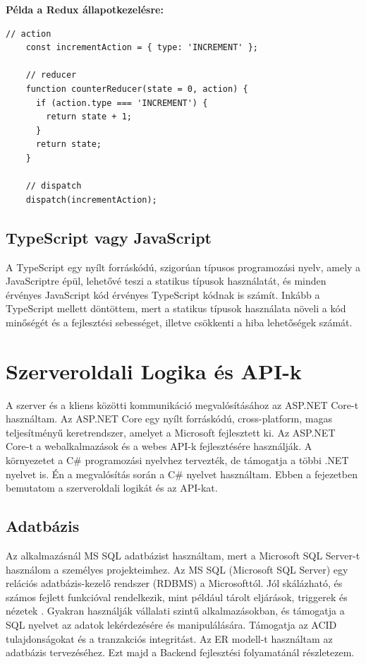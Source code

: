 \textbf{Példa a Redux állapotkezelésre:}
\begin{lstlisting}[style=es6, morekeywords={document, P5, katex}]
    // action
    const incrementAction = { type: 'INCREMENT' };
    
    // reducer
    function counterReducer(state = 0, action) {
      if (action.type === 'INCREMENT') {
        return state + 1;
      }
      return state;
    }
    
    // dispatch
    dispatch(incrementAction);
\end{lstlisting}

\subsection*{TypeScript vagy JavaScript}
A TypeScript egy nyílt forráskódú, szigorúan típusos programozási nyelv,
amely a JavaScriptre épül, lehetővé teszi a statikus típusok használatát,
és minden érvényes JavaScript kód érvényes TypeScript kódnak is számít.
Inkább a TypeScript mellett döntöttem, mert a statikus típusok használata
növeli a kód minőségét és a fejlesztési sebességet, illetve csökkenti a hiba lehetőségek számát.

\section{Szerveroldali Logika és API-k}
A szerver és a kliens közötti kommunikáció megvalósításához az ASP.NET Core-t használtam.
Az ASP.NET Core egy nyílt forráskódú, cross-platform, magas teljesítményű keretrendszer,
amelyet a Microsoft fejlesztett ki.
Az ASP.NET Core-t a webalkalmazások és a webes API-k fejlesztésére használják.
A környezetet a C\# programozási nyelvhez tervezték, de támogatja a többi .NET nyelvet is.
Én a megvalósítás során a C\# nyelvet használtam.
Ebben a fejezetben bemutatom a szerveroldali logikát és az API-kat.

\subsection*{Adatbázis}
Az alkalmazásnál MS SQL adatbázist használtam, mert a Microsoft SQL Server-t használom a személyes projekteimhez.
Az MS SQL (Microsoft SQL Server) egy relációs adatbázis-kezelő rendszer (RDBMS) a Microsofttól. Jól skálázható, és számos fejlett funkcióval rendelkezik,
mint például tárolt eljárások,
triggerek és nézetek
. Gyakran használják vállalati szintű alkalmazásokban,
és támogatja a SQL nyelvet az adatok lekérdezésére és manipulálására.
Támogatja az ACID tulajdonságokat és a tranzakciós integritást.
Az ER modell-t használtam az adatbázis tervezéséhez.
Ezt majd a Backend fejlesztési folyamatánál részletezem.


